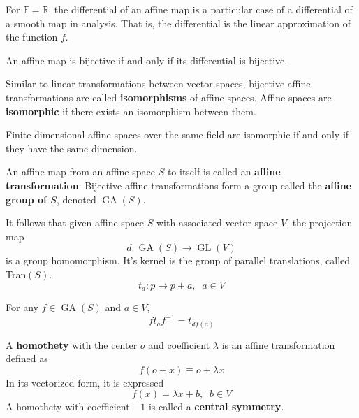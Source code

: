 \documentclass{article}
\DeclareMathOperator{\GL}{GL}
\DeclareMathOperator{\GA}{GA}
\begin{document}
    For $\mathbb{F} = \mathbb{R}$, the differential of an affine map is a particular case of a differential of a smooth map in analysis. That is, the differential is the linear approximation of the function $f$. 

    \begin{proposition}
      An affine map is bijective if and only if its differential is bijective. 
    \end{proposition}

    \begin{definition}
      Similar to linear transformations between vector spaces, bijective affine transformations are called \textbf{isomorphisms} of affine spaces. Affine spaces are \textbf{isomorphic} if there exists an isomorphism between them. 
    \end{definition}

    \begin{corollary}
      Finite-dimensional affine spaces over the same field are isomorphic if and only if they have the same dimension. 
    \end{corollary}

    \begin{definition}
      An affine map from an affine space $S$ to itself is called an \textbf{affine transformation}. Bijective affine transformations form a group called the \textbf{affine group of $S$}, denoted $\GA(S)$. 
    \end{definition}

    It follows that given affine space $S$ with associated vector space $V$, the projection map
    \begin{equation}
      d: \GA(S) \longrightarrow \GL(V)
    \end{equation}
    is a group homomorphism. It's kernel is the group of parallel translations, called Tran$(S)$. 
    \begin{equation}
      t_a : p \mapsto p + a, \;\; a \in V
    \end{equation}

    \begin{proposition}
      For any $f \in \GA(S)$ and $a \in V$, 
      \begin{equation}
        f t_a f^{-1} = t_{df(a)}
      \end{equation}
    \end{proposition}

    \begin{definition}
      A \textbf{homothety} with the center $o$ and coefficient $\lambda$ is an affine transformation defined as
      \begin{equation}
        f( o + x ) \equiv o + \lambda x
      \end{equation}
      In its vectorized form, it is expressed
      \begin{equation}
        f(x) = \lambda x + b, \;\; b \in V
      \end{equation}
      A homothety with coefficient $-1$ is called a \textbf{central symmetry}. 
    \end{definition}
\end{document}
